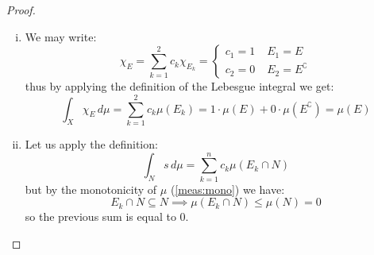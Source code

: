 \begin{proof}
    \hspace*{\fill} %
    \begin{enumerate}[i)]
        \item We may write:
            \[
                \chi_E = \sum_{k=1}^2 c_k \chi_{E_k} = \begin{cases}
                    c_1 = 1 & \;E_1 = E \\
                    c_2 = 0 & \; E_2 = E^\complement
                \end{cases}
            \]
            thus by applying the definition of the Lebesgue integral we get:
            \[
                \int_X \chi_E\,d\mu = \sum_{k=1}^2 c_k \mu(E_k) = 1\cdot\mu(E) + 0 \cdot \mu(E^\complement) = \mu(E)
            \]
        \item Let us apply the definition:
            \[
                \int_N s\,d\mu = \sum_{k=1}^n c_k \mu(E_k\cap N)
            \]
            but by the monotonicity of $\mu$ (\ref{meas:mono}) we have:
            \[
                E_k\cap N \subseteq N \implies \mu(E_k\cap N) \leq \mu(N) = 0      
            \]
            so the previous sum is equal to $0$.
    \end{enumerate}
\end{proof}